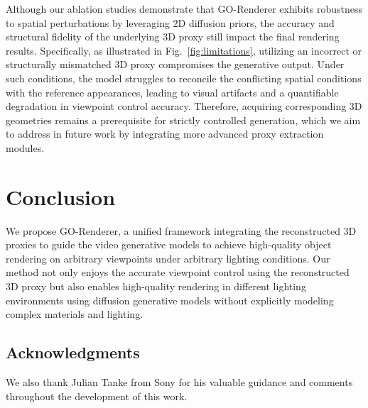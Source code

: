 \documentclass[runningheads]{llncs}
\newcommand{\methodname}{GO-Renderer\xspace}
\begin{document}
Although our ablation studies demonstrate that \methodname exhibits robustness to spatial perturbations by leveraging 2D diffusion priors, the accuracy and structural fidelity of the underlying 3D proxy still impact the final rendering results. Specifically, as illustrated in Fig.~\ref{fig:limitations}, utilizing an incorrect or structurally mismatched 3D proxy compromises the generative output. Under such conditions, the model struggles to reconcile the conflicting spatial conditions with the reference appearances, leading to visual artifacts and a quantifiable degradation in viewpoint control accuracy. Therefore, acquiring corresponding 3D geometries remains a prerequisite for strictly controlled generation, which we aim to address in future work by integrating more advanced proxy extraction modules.

\section{Conclusion}
\label{sec:conclusion}
We propose \methodname, a unified framework integrating the reconstructed 3D proxies to guide the video generative models to achieve high-quality object rendering on arbitrary viewpoints under arbitrary lighting conditions. 
Our method not only enjoys the accurate viewpoint control using the reconstructed 3D proxy but also enables high-quality rendering in different lighting environments using diffusion generative models without explicitly modeling complex materials and lighting.

\subsection*{Acknowledgments}
We also thank Julian Tanke from Sony for his valuable guidance and comments throughout the development of this work.


%
%


\end{document}
